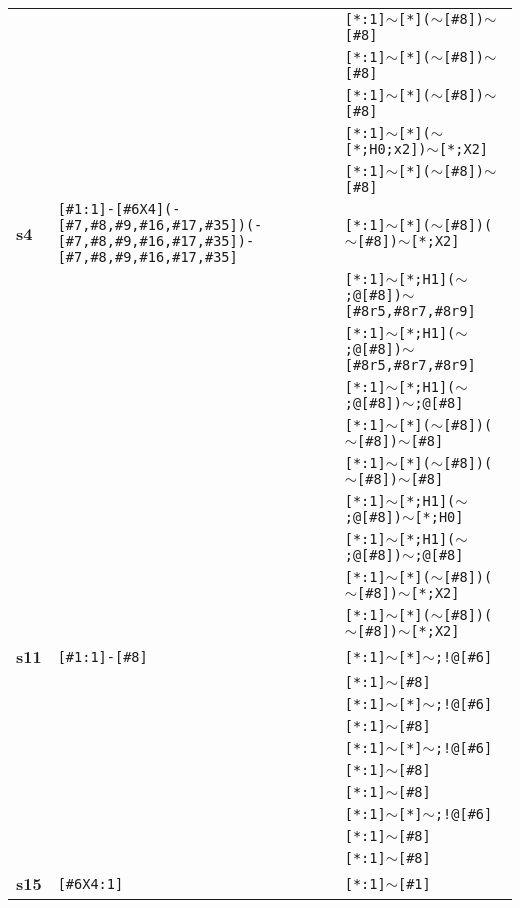 \begin{longtable}{>{\baselineskip=10pt}p{} >{\baselineskip=10pt}p{} >{\baselineskip=10pt}p{}}
 &  & \texttt{[*:1]$\sim$[*]($\sim$[\#8])$\sim$[\#8]} \\ 
 &  & \texttt{[*:1]$\sim$[*]($\sim$[\#8])$\sim$[\#8]} \\ 
 &  & \texttt{[*:1]$\sim$[*]($\sim$[\#8])$\sim$[\#8]} \\ 
 &  & \texttt{[*:1]$\sim$[*]($\sim$[*;H0;x2])$\sim$[*;X2]} \\ 
 &  & \texttt{[*:1]$\sim$[*]($\sim$[\#8])$\sim$[\#8]} \\ 
\hline 
\textbf{s4} & \texttt{[\#1:1]-[\#6X4](-[\#7,\#8,\#9,\#16,\#17,\#35])(-[\#7,\#8,\#9,\#16,\#17,\#35])-[\#7,\#8,\#9,\#16,\#17,\#35]} & \texttt{[*:1]$\sim$[*]($\sim$[\#8])($\sim$[\#8])$\sim$[*;X2]} \\ 
 &  & \texttt{[*:1]$\sim$[*;H1]($\sim$;@[\#8])$\sim$[\#8r5,\#8r7,\#8r9]} \\ 
 &  & \texttt{[*:1]$\sim$[*;H1]($\sim$;@[\#8])$\sim$[\#8r5,\#8r7,\#8r9]} \\ 
 &  & \texttt{[*:1]$\sim$[*;H1]($\sim$;@[\#8])$\sim$;@[\#8]} \\ 
 &  & \texttt{[*:1]$\sim$[*]($\sim$[\#8])($\sim$[\#8])$\sim$[\#8]} \\ 
 &  & \texttt{[*:1]$\sim$[*]($\sim$[\#8])($\sim$[\#8])$\sim$[\#8]} \\ 
 &  & \texttt{[*:1]$\sim$[*;H1]($\sim$;@[\#8])$\sim$[*;H0]} \\ 
 &  & \texttt{[*:1]$\sim$[*;H1]($\sim$;@[\#8])$\sim$;@[\#8]} \\ 
 &  & \texttt{[*:1]$\sim$[*]($\sim$[\#8])($\sim$[\#8])$\sim$[*;X2]} \\ 
 &  & \texttt{[*:1]$\sim$[*]($\sim$[\#8])($\sim$[\#8])$\sim$[*;X2]} \\ 
\hline 
\textbf{s11} & \texttt{[\#1:1]-[\#8]} & \texttt{[*:1]$\sim$[*]$\sim$;!@[\#6]} \\ 
 &  & \texttt{[*:1]$\sim$[\#8]} \\ 
 &  & \texttt{[*:1]$\sim$[*]$\sim$;!@[\#6]} \\ 
 &  & \texttt{[*:1]$\sim$[\#8]} \\ 
 &  & \texttt{[*:1]$\sim$[*]$\sim$;!@[\#6]} \\ 
 &  & \texttt{[*:1]$\sim$[\#8]} \\ 
 &  & \texttt{[*:1]$\sim$[\#8]} \\ 
 &  & \texttt{[*:1]$\sim$[*]$\sim$;!@[\#6]} \\ 
 &  & \texttt{[*:1]$\sim$[\#8]} \\ 
 &  & \texttt{[*:1]$\sim$[\#8]} \\ 
\hline 
\textbf{s15} & \texttt{[\#6X4:1]} & \texttt{[*:1]$\sim$[\#1]} \\ 

\end{longtable}
